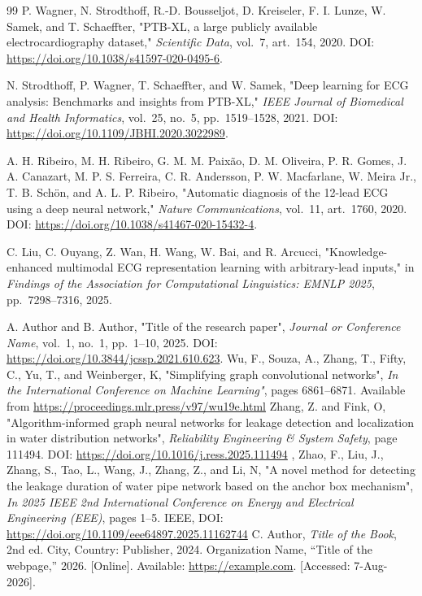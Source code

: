 \documentclass{ssnreview}
\begin{document}
\begin{thebibliography}{99}
P. Wagner, N. Strodthoff, R.-D. Bousseljot, D. Kreiseler, F. I. Lunze,
W. Samek, and T. Schaeffter, "PTB-XL, a large publicly available
electrocardiography dataset," \textit{Scientific Data}, vol.~7, art.~154, 2020.
DOI: \url{https://doi.org/10.1038/s41597-020-0495-6}.

N. Strodthoff, P. Wagner, T. Schaeffter, and W. Samek,
"Deep learning for ECG analysis: Benchmarks and insights from PTB-XL,"
\textit{IEEE Journal of Biomedical and Health Informatics}, vol.~25, no.~5,
pp.~1519--1528, 2021.
DOI: \url{https://doi.org/10.1109/JBHI.2020.3022989}.

A. H. Ribeiro, M. H. Ribeiro, G. M. M. Paix\~ao, D. M. Oliveira,
P. R. Gomes, J. A. Canazart, M. P. S. Ferreira, C. R. Andersson,
P. W. Macfarlane, W. Meira Jr., T. B. Sch\"on, and A. L. P. Ribeiro,
"Automatic diagnosis of the 12-lead ECG using a deep neural network,"
\textit{Nature Communications}, vol.~11, art.~1760, 2020.
DOI: \url{https://doi.org/10.1038/s41467-020-15432-4}.

C. Liu, C. Ouyang, Z. Wan, H. Wang, W. Bai, and R. Arcucci,
"Knowledge-enhanced multimodal ECG representation learning with arbitrary-lead
inputs," in \textit{Findings of the Association for Computational Linguistics:
EMNLP 2025}, pp.~7298--7316, 2025.

 A. Author and B. Author, "Title of the research paper", \textit{Journal or Conference Name}, vol.~1, no.~1, pp.~1--10, 2025.
DOI: \url{https://doi.org/10.3844/jcssp.2021.610.623}.
 Wu, F., Souza, A., Zhang, T., Fifty, C., Yu, T., and Weinberger, K, "Simplifying graph convolutional networks", \textit{In the International Conference on Machine Learning"}, pages 6861–6871. Available from \url{https://proceedings.mlr.press/v97/wu19e.html}
 Zhang, Z. and Fink, O, "Algorithm-informed graph neural networks for leakage detection and localization in water distribution networks", \textit{Reliability Engineering \& System Safety}, page 111494. DOI: \url{https://doi.org/10.1016/j.ress.2025.111494}
, Zhao, F., Liu, J., Zhang, S., Tao, L., Wang, J., Zhang, Z., and Li, N, "A novel method for detecting the leakage duration of water pipe network based on the anchor box mechanism", \textit{In 2025 IEEE 2nd International Conference on Energy and Electrical Engineering (EEE)}, pages 1–5. IEEE, DOI: \url{https://doi.org/10.1109/eee64897.2025.11162744}
 C. Author, \textit{Title of the Book}, 2nd ed. City, Country: Publisher, 2024.
 Organization Name, ``Title of the webpage,'' 2026. [Online]. Available: \url{https://example.com}. [Accessed: 7-Aug-2026].
\end{thebibliography}
\end{document}
